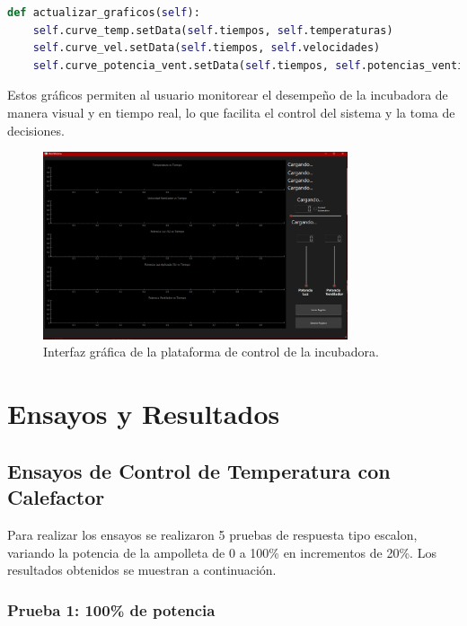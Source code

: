 \documentclass[spanish, a4paper, 11pt]{article}
\begin{document}
\begin{lstlisting}[language=Python]
def actualizar_graficos(self):
    self.curve_temp.setData(self.tiempos, self.temperaturas)
    self.curve_vel.setData(self.tiempos, self.velocidades)
    self.curve_potencia_vent.setData(self.tiempos, self.potencias_ventilador)
\end{lstlisting}

Estos gráficos permiten al usuario monitorear el desempeño de la incubadora de manera visual y en tiempo real, lo que facilita el control del sistema y la toma de decisiones.

\begin{figure}[ht]
    \centering
    \includegraphics[width=0.8\textwidth]{./figures/Interfaz.png}
    \caption{Interfaz gráfica de la plataforma de control de la incubadora.}
\end{figure}
\FloatBarrier



\section{Ensayos y Resultados}

\subsection{Ensayos de Control de Temperatura con Calefactor}

Para realizar los ensayos se realizaron 5 pruebas de respuesta tipo escalon, variando la potencia de la ampolleta de 0 a 100\% en incrementos de 20\%. Los resultados obtenidos se muestran a continuación.

\subsubsection{Prueba 1: 100\% de potencia}
\end{document}
